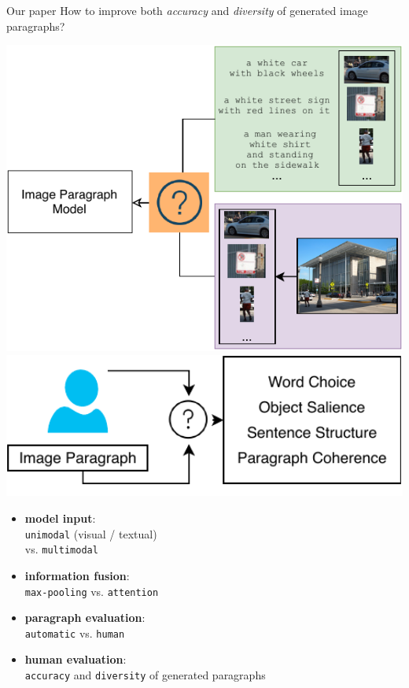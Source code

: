 \documentclass[notes=hide]{beamer}
\begin{document}
\begin{frame}{Our paper}
\small
{How to improve both \textit{accuracy} and \textit{diversity} of generated image paragraphs?}
\begin{minipage}{0.2\textwidth}
\vspace{.5cm}
\includegraphics[width=2.5\textwidth]{hyp}
\includegraphics[width=2.5\textwidth]{human}
\end{minipage} \hfill
\begin{minipage}{0.5\textwidth}
\vspace{.5cm}
\begin{itemize}
\item \textbf{model input}:\\ \texttt{unimodal} (visual / textual)\\ vs. \texttt{multimodal}
\item \textbf{information fusion}:\\ \texttt{max-pooling} vs. \texttt{attention}
\item \textbf{paragraph evaluation}:\\ \texttt{automatic} vs. \texttt{human}
\pause
\item \textbf{human evaluation}:\\ \texttt{accuracy} and \texttt{diversity} of generated paragraphs
\end{itemize}
\end{minipage}
\end{frame}
\end{document}
